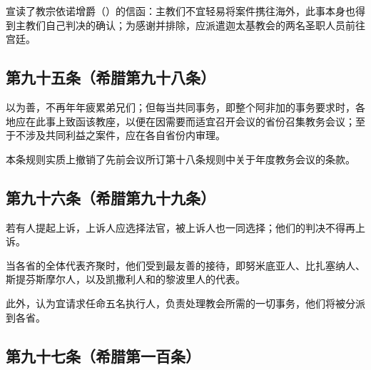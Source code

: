 宣读了教宗依诺增爵（）的信函：主教们不宜轻易将案件携往海外，此事本身也得到主教们自己判决的确认；为感谢并排除，应派遣迦太基教会的两名圣职人员前往宫廷。\par


\subsection{第九十五条（希腊第九十八条）}

\par

以为善，不再年年疲累弟兄们；但每当共同事务，即整个阿非加的事务要求时，各地应在此事上致函该教座，以便在因需要而适宜召开会议的省份召集教务会议；至于不涉及共同利益之案件，应在各自省份内审理。\par

本条规则实质上撤销了先前会议所订第十八条规则中关于年度教务会议的条款。\par


\subsection{第九十六条（希腊第九十九条）}

\par

若有人提起上诉，上诉人应选择法官，被上诉人也一同选择；他们的判决不得再上诉。\par

\par

当各省的全体代表齐聚时，他们受到最友善的接待，即努米底亚人、比扎塞纳人、斯提芬斯摩尔人，以及凯撒利人和的黎波里人的代表。\par

\par

此外，认为宜请求任命五名执行人，负责处理教会所需的一切事务，他们将被分派到各省。\par


\subsection{第九十七条（希腊第一百条）}

